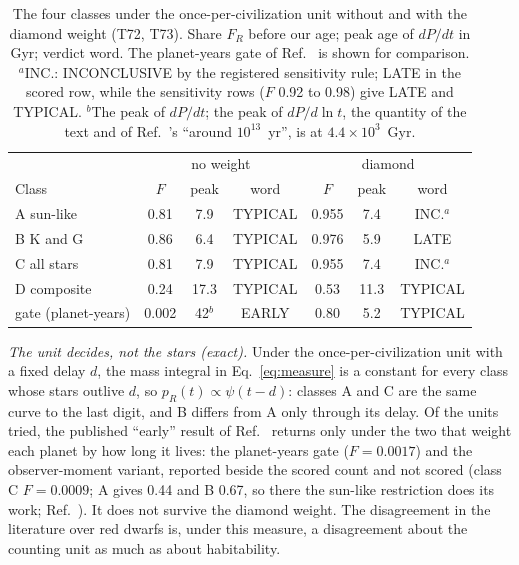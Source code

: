\documentclass[pre,twocolumn,superscriptaddress,nofootinbib]{revtex4-2}
\begin{document}
\begin{table}[t]
\caption{The four classes under the once-per-civilization unit without and with the diamond weight (T72, T73).
Share $F_R$ before our age; peak age of $dP/dt$ in Gyr; verdict word. The planet-years gate of Ref.~\cite{LBS16} is
shown for comparison. $^a$INC.: INCONCLUSIVE by the registered sensitivity rule; LATE in the scored row, while the
sensitivity rows ($F$ 0.92 to 0.98) give LATE and TYPICAL. $^b$The peak of $dP/dt$; the peak of $dP/d\ln t$, the
quantity of the text and of Ref.~\cite{LBS16}'s ``around $10^{13}$~yr'', is at $4.4 \times 10^{3}$~Gyr.}
\label{tab:results}
\begin{ruledtabular}
\begin{tabular}{lcccccc}
 & \multicolumn{3}{c}{no weight} & \multicolumn{3}{c}{diamond} \\
Class & $F$ & peak & word & $F$ & peak & word \\
\hline
A sun-like & 0.81 & 7.9 & TYPICAL & 0.955 & 7.4 & INC.$^a$ \\
B K and G & 0.86 & 6.4 & TYPICAL & 0.976 & 5.9 & LATE \\
C all stars & 0.81 & 7.9 & TYPICAL & 0.955 & 7.4 & INC.$^a$ \\
D composite & 0.24 & 17.3 & TYPICAL & 0.53 & 11.3 & TYPICAL \\
gate (planet-years) & 0.002 & 42$^b$ & EARLY & 0.80 & 5.2 & TYPICAL \\
\end{tabular}
\end{ruledtabular}
\end{table}

\emph{The unit decides, not the stars (exact).} Under the once-per-civilization unit with a fixed delay $d$, the mass
integral in Eq.~\eqref{eq:measure} is a constant for every class whose stars outlive $d$, so $p_R(t) \propto
\psi(t-d)$: classes A and C are the same curve to the last digit, and B differs from A only through its delay. Of the
units tried, the published ``early'' result of Ref.~\cite{LBS16} returns only under the two that weight each planet by
how long it lives: the planet-years gate ($F = 0.0017$) and the observer-moment variant, reported beside the scored
count and not scored (class C $F = 0.0009$; A gives 0.44 and B 0.67, so there the sun-like restriction does its work;
Ref.~\cite{repo}). It does not survive the diamond weight. The disagreement in the literature over red dwarfs is,
under this measure, a disagreement about the counting unit as much as about habitability.
\end{document}
